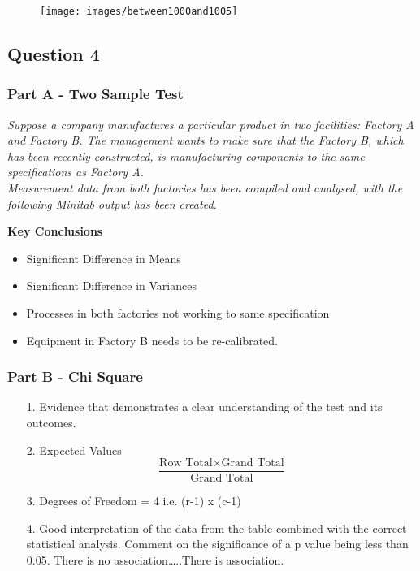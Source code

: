 \documentclass[a4paper,12pt]{article}
\begin{document}
\begin{figure}[h!]
	\centering
	\texttt{[image: images/between1000and1005]}
	
\end{figure}


\newpage




\subsection*{Question 4}
\subsubsection*{Part A - Two Sample Test}
\textit{Suppose a company manufactures a particular product in two facilities: Factory A and Factory B.
The management wants to make sure that the Factory B, which has been recently constructed, is manufacturing 
components to the same specifications as Factory A.}
\\
\noindent \textit{Measurement data from both factories has been compiled and analysed, with the following Minitab output has been created.}

\noindent \textbf{Key Conclusions}
\begin{itemize}
	\item Significant Difference in Means
	\item Significant Difference in Variances
	\item Processes in both factories not working to same specification
	\item Equipment in Factory B needs to be re-calibrated.
\end{itemize}

\subsubsection*{Part B - Chi Square}



\begin{itemize}
	\item[1.] Evidence that demonstrates a clear
	understanding of the test and its outcomes. 
	\item[2.] Expected Values
	\[  \frac{\mbox{Row Total} \times \mbox{Grand Total} }{\mbox{Grand Total}} \]
	\item[3.] Degrees of Freedom = 4 i.e. (r-1) x (c-1)
	
	\item[4.]  Good interpretation of the data from the table combined with the correct
	statistical analysis.  Comment on the significance of a p value being less than 0.05. There is no association…..There is association.

\end{itemize}
\end{document}
